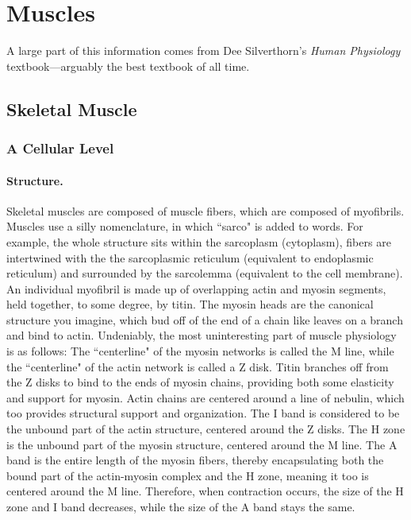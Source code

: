 \documentclass[12pt]{report}
\begin{document}
\chapter{Muscles}

A large part of this information comes from Dee Silverthorn's \textit{Human Physiology} textbook---arguably the best textbook of all time. 

\section{Skeletal Muscle}
\subsection{A Cellular Level}
\subsubsection{Structure.}
Skeletal muscles are composed of muscle fibers, which are composed of myofibrils. Muscles use a silly nomenclature, in which ``sarco" is added to words. For example, the whole structure sits within the sarcoplasm (cytoplasm), fibers are intertwined with the the sarcoplasmic reticulum (equivalent to endoplasmic reticulum) and surrounded by the sarcolemma (equivalent to the cell membrane). An individual myofibril is made up of overlapping actin and myosin segments, held together, to some degree, by titin. The myosin heads are the canonical structure you imagine, which bud off of the end of a chain like leaves on a branch and bind to actin. Undeniably, the most uninteresting part of muscle physiology is as follows: The ``centerline" of the myosin networks is called the M line, while the ``centerline" of the actin network is called a Z disk. Titin branches off from the Z disks to bind to the ends of myosin chains, providing both some elasticity and support for myosin. Actin chains are centered around a line of nebulin, which too provides structural support and organization. The I band is considered to be the unbound part of the actin structure, centered around the Z disks. The H zone is the unbound part of the myosin structure, centered around the M line. The A band is the entire length of the myosin fibers, thereby encapsulating both the bound part of the actin-myosin complex and the H zone, meaning it too is centered around the M line. Therefore, when contraction occurs, the size of the H zone and I band decreases, while the size of the A band stays the same.
\end{document}

